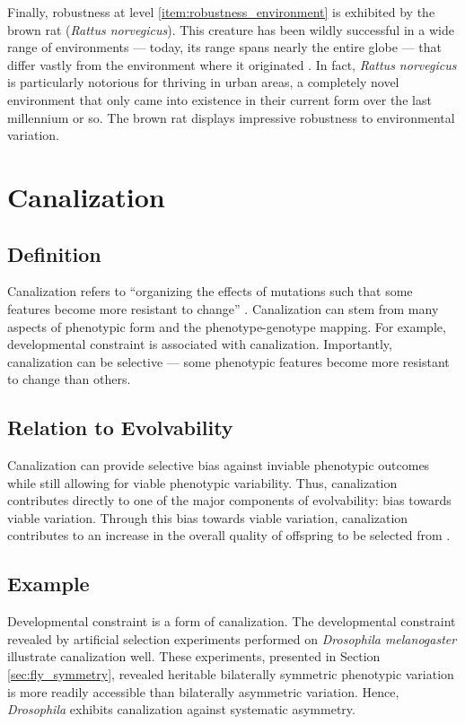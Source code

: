 Finally, robustness at level \ref{item:robustness_environment} is exhibited by the brown rat (\textit{Rattus norvegicus}). This creature has been wildly successful in a wide range of environments --- today, its range spans nearly the entire globe --- that differ vastly from the environment where it originated \cite{Wikipediacontributors2016BrownRat}. In fact, \textit{Rattus norvegicus} is particularly notorious for thriving in urban areas, a completely novel environment that only came into existence in their current form over the last millennium or so. The brown rat displays impressive robustness to environmental variation.

\section{Canalization} \label{sec:canalization}
\subsection{Definition}
Canalization refers to ``organizing the effects of mutations such that some features become more resistant to change'' \cite{Reisinger2005TowardsEvolvability}.
Canalization can stem from many aspects of phenotypic form and the phenotype-genotype mapping.
For example, developmental constraint is associated with canalization.
Importantly, canalization can be selective --- some phenotypic features become more resistant to change than others.

\subsection{Relation to Evolvability}

Canalization can provide selective bias against inviable phenotypic outcomes while still allowing for viable phenotypic variability.
Thus, canalization contributes directly to one of the major components of evolvability: bias towards viable variation.
Through this bias towards viable variation, canalization contributes to an increase in the overall quality of offspring to be selected from \cite[p 40]{Downing2015IntelligenceSystems}.

\subsection{Example}
Developmental constraint is a form of canalization.
The developmental constraint revealed by artificial selection experiments performed on \textit{Drosophila melanogaster} illustrate canalization well.
These experiments, presented in Section \ref{sec:fly_symmetry}, revealed heritable bilaterally symmetric phenotypic variation is more readily accessible than bilaterally asymmetric variation.
Hence, \textit{Drosophila} exhibits canalization against systematic asymmetry.

